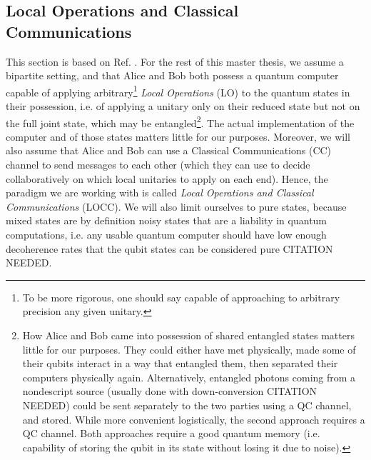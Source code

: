


\subsection{Local Operations and Classical Communications} \label{sec:LOCC}

This section is based on Ref. \cite[pp. 19-21]{chitambar_quantum_2019}%
. For the rest of this master thesis, we assume a bipartite setting, and that Alice and Bob both possess a quantum computer capable of applying arbitrary\footnote{To be more rigorous, one should say capable of approaching to arbitrary precision any given unitary.} \textit{Local Operations} (LO) to the quantum states in their possession, i.e. of applying a unitary only on their reduced state but not on the full joint state, which may be entangled\footnote{How Alice and Bob came into possession of shared entangled states matters little for our purposes. They could either have met physically, made some of their qubits interact in a way that entangled them, then separated their computers physically again. Alternatively, entangled photons coming from a nondescript source (usually done with down-conversion CITATION NEEDED) could be sent separately to the two parties using a QC channel, and stored. While more convenient logistically, the second approach requires a QC channel. Both approaches require a good quantum memory (i.e. capability of storing the qubit in its state without losing it due to noise).}. The actual implementation of the computer and of those states matters little for our purposes. Moreover, we will also assume that Alice and Bob can use a Classical Communications (CC) channel to send messages to each other (which they can use to decide collaboratively on which local unitaries to apply on each end). Hence, the paradigm we are working with is called \textit{Local Operations and Classical Communications} (LOCC). We will also limit ourselves to pure states, because mixed states are by definition noisy states that are a liability in quantum computations, i.e. any usable quantum computer should have low enough decoherence rates that the qubit states can be considered pure CITATION NEEDED.

